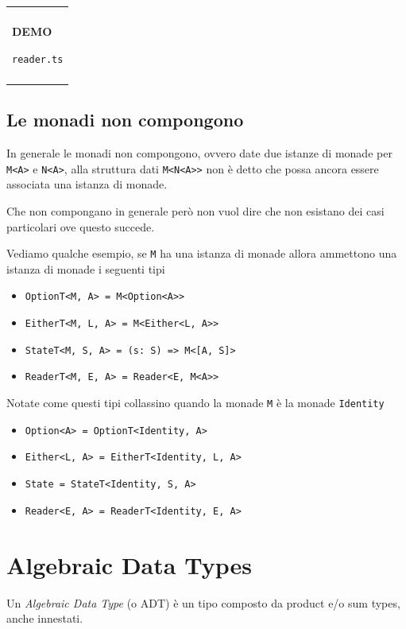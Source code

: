 \documentclass[12pt]{article}
\newenvironment{boxed}
    {\begin{center}
    \begin{tabular}{|p{0.9\textwidth}|}
    \hline\\
    }
    {
    \\\\\hline
    \end{tabular}
    \end{center}
    }
\begin{document}
\begin{boxed}
\begin{center}
\textbf{DEMO}

\texttt{reader.ts}
\end{center}
\end{boxed}


\subsection{Le monadi non compongono}

In generale le monadi non compongono, ovvero date due istanze di monade per \texttt{M<A>} e \texttt{N<A>},
alla struttura dati \texttt{M<N<A>>} non è detto che possa ancora essere associata una istanza di monade.

Che non compongano in generale però non vuol dire che non esistano dei casi particolari ove questo succede.

Vediamo qualche esempio, se \texttt{M} ha una istanza di monade allora ammettono una istanza di monade i seguenti tipi

\begin{itemize}
  \item \texttt{OptionT<M, A> = M<Option<A>>}
  \item \texttt{EitherT<M, L, A> = M<Either<L, A>>}
  \item \texttt{StateT<M, S, A> = (s: S) => M<[A, S]>}
  \item \texttt{ReaderT<M, E, A> = Reader<E, M<A>>}
\end{itemize}

Notate come questi tipi collassino quando la monade \texttt{M} è la monade \texttt{Identity}

\begin{itemize}
  \item \texttt{Option<A> = OptionT<Identity, A>}
  \item \texttt{Either<L, A> = EitherT<Identity, L, A>}
  \item \texttt{State = StateT<Identity, S, A>}
  \item \texttt{Reader<E, A> = ReaderT<Identity, E, A>}
\end{itemize}

\newpage

\section{Algebraic Data Types}

Un \emph{Algebraic Data Type} (o ADT) è un tipo composto da product e/o sum types, anche innestati.
\end{document}
